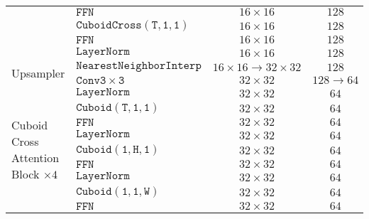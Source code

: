 \documentclass{article}
\begin{document}
\begin{table}[!tb]
\begin{center}
{\begin{tabular}{l|l|c|c}
                                                        & $\mathtt{FFN}$            & $16\times16$                      & $128$             \\
                                                        & $\mathtt{CuboidCross(T,1,1)}$  & $16\times16$                 & $128$             \\
                                                        & $\mathtt{FFN}$            & $16\times16$                      & $128$             \\
                                                        & $\mathtt{LayerNorm}$      & $16\times16$                      & $128$             \\\hline
    \multirow{2}{*}{Upsampler}                          & $\mathtt{NearestNeighborInterp}$  & $16\times16\rightarrow32\times32$ & $128$     \\
                                                        & $\mathtt{Conv3\times3}$   & $32\times32$                      & $128\rightarrow64$\\\hline 
    \multirow{12}{*}{Cuboid Cross Attention Block $\times 4$}& $\mathtt{LayerNorm}$      & $32\times32$                 & $64$              \\
                                                        & $\mathtt{Cuboid(T,1,1)}$  & $32\times32$                      & $64$              \\
                                                        & $\mathtt{FFN}$            & $32\times32$                      & $64$              \\
                                                        & $\mathtt{LayerNorm}$      & $32\times32$                      & $64$              \\
                                                        & $\mathtt{Cuboid(1,H,1)}$  & $32\times32$                      & $64$              \\
                                                        & $\mathtt{FFN}$            & $32\times32$                      & $64$              \\
                                                        & $\mathtt{LayerNorm}$      & $32\times32$                      & $64$              \\
                                                        & $\mathtt{Cuboid(1,1,W)}$  & $32\times32$                      & $64$              \\
                                                        & $\mathtt{FFN}$            & $32\times32$                      & $64$              \\

\end{tabular}}
\end{center}
\end{table}
\end{document}
